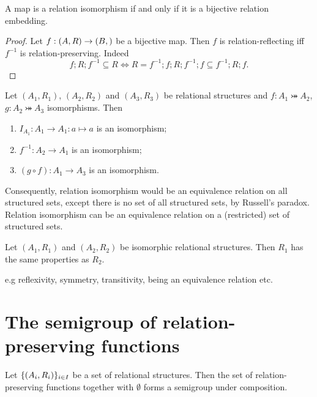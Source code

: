 \begin{lemma}
A map is a relation isomorphism \textup{if and only if} it is a bijective relation embedding.
\end{lemma}
\begin{proof}
Let $f: \left( A, R \right)\to \left( B,  \right)$ be a bijective map. Then $f$ is relation-reflecting iff $f^{-1}$ is relation-preserving. Indeed
\[ f;R;f^{-1} \subseteq R \iff R = f^{-1};f;R;f^{-1};f \subseteq f^{-1};R;f. \]
\end{proof}

\begin{lemma} \label{isomorphismEquivalence}
Let $(A_1, R_1)$, $(A_2, R_2)$ and $(A_3, R_3)$ be relational structures and $f:A_1 \twoheadrightarrowtail A_2$, $g:A_2 \twoheadrightarrowtail A_3$ isomorphisms. Then
\begin{enumerate}
\item $I_{A_1}: A_1 \to A_1: a\mapsto a$ is an isomorphism;
\item $f^{-1}: A_2\to A_1$ is an isomorphism;
\item $(g\circ f): A_1\to A_3$ is an isomorphism.
\end{enumerate}
\end{lemma}
Consequently, relation isomorphism would be an equivalence relation on all structured sets, except there is no set of all structured sets, by Russell's paradox. Relation isomorphism can be an equivalence relation on a (restricted) set of structured sets.

\begin{lemma}
Let $(A_1, R_1)$ and $(A_2, R_2)$ be isomorphic relational structures. Then $R_1$ has the same properties as $R_2$.
\end{lemma}
e.g\: reflexivity, symmetry, transitivity, being an equivalence relation etc.


\section{The semigroup of relation-preserving functions}
\begin{lemma}
Let $\{\left( A_i, R_i \right)\}_{i\in I}$ be a set of relational structures. Then the set of relation-preserving functions together with $\emptyset$ forms a semigroup under composition.
\end{lemma}


